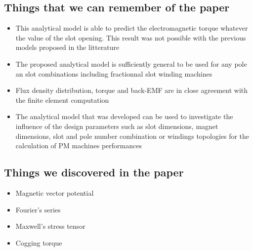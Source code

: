 \subsection{Things that we can remember of the paper}
\begin{itemize}
    \item This analytical model is able to predict the electromagnetic torque whatever the value of the slot opening. This result was not possible with the previous models proposed in the litterature
    \item The proposed analytical model is sufficiently general to be used for any pole an slot combinations including fractionnal slot winding machines
    \item Flux density distribution, torque and back-EMF are in close agreement with the finite element computation
    \item The analytical model that was developed can be used to investigate the influence of the design parameters such as slot dimensions, magnet dimensions, slot and pole number combination or windings topologies for the calculation of PM machines performances
\end{itemize}

\subsection{Things we discovered in the paper}
\begin{itemize}
    \item Magnetic vector potential
    \item Fourier's series
    \item Maxwell's stress tensor
    \item Cogging torque
\end{itemize}
